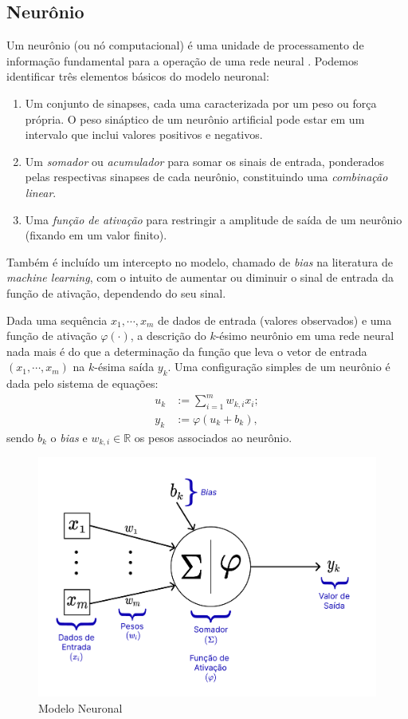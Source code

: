 \documentclass{automatextcc}
\newcommand{\R}{\mathds{R}}
\begin{document}
\subsection{Neurônio}
Um neurônio (ou nó computacional) é uma unidade de processamento de informação fundamental para a operação de uma rede neural \citep{haykin2009}. Podemos identificar três elementos básicos do modelo neuronal:
\begin{enumerate}
    \item Um conjunto de sinapses, cada uma caracterizada por um peso ou força própria. O peso sináptico de um neurônio artificial pode estar em um intervalo que inclui valores positivos e negativos.
    \item Um \textit{somador} ou \textit{acumulador} para somar os sinais de entrada, ponderados pelas respectivas sinapses de cada neurônio, constituindo uma \textit{combinação linear}.
    \item Uma \textit{função de ativação} para restringir a amplitude de saída de um neurônio (fixando em um valor finito).
\end{enumerate}
Também é incluído um intercepto no modelo, chamado de \textit{bias} na literatura de \textit{machine learning}, com o intuito de aumentar ou diminuir o sinal de entrada da função de ativação, dependendo do seu sinal.

Dada uma sequência $x_1,\cdots,x_m$ de dados de entrada (valores observados) e uma função de ativação $\varphi(\cdot)$, a descrição do $k$-ésimo neurônio em uma rede neural nada mais é do que a determinação da função que leva o vetor de entrada $(x_1,\cdots,x_m)$ na $k$-ésima saída $y_k$. Uma configuração simples de um neurônio é dada pelo sistema de equações:
\begin{align*}
    u_k & := \sum_{i=1}^{m} w_{k,i}x_i; \\   
    y_k & := \varphi(u_k + b_k),
\end{align*}
sendo $b_k$ o \textit{bias} e $w_{k,i} \in \R$ os pesos associados ao neurônio.

\begin{figure}
    \centering
    \includegraphics[width=.7\textwidth]{figuras/neuron_model.pdf}
	\caption{Modelo Neuronal \citep[adaptado de][]{hair2005,haykin2009}}
\end{figure}
\end{document}
